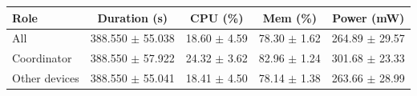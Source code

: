 \begin{tabular}{lcccc}
\hline
\textbf{Role} & \textbf{Duration (s)} & \textbf{CPU (\%)} & \textbf{Mem (\%)} & \textbf{Power (mW)} \\
\hline
All & 388.550 $\pm$ 55.038 & 18.60 $\pm$ 4.59 & 78.30 $\pm$ 1.62 & 264.89 $\pm$ 29.57 \\
Coordinator & 388.550 $\pm$ 57.922 & 24.32 $\pm$ 3.62 & 82.96 $\pm$ 1.24 & 301.68 $\pm$ 23.33 \\
Other devices & 388.550 $\pm$ 55.041 & 18.41 $\pm$ 4.50 & 78.14 $\pm$ 1.38 & 263.66 $\pm$ 28.99 \\
\hline
\end{tabular}
